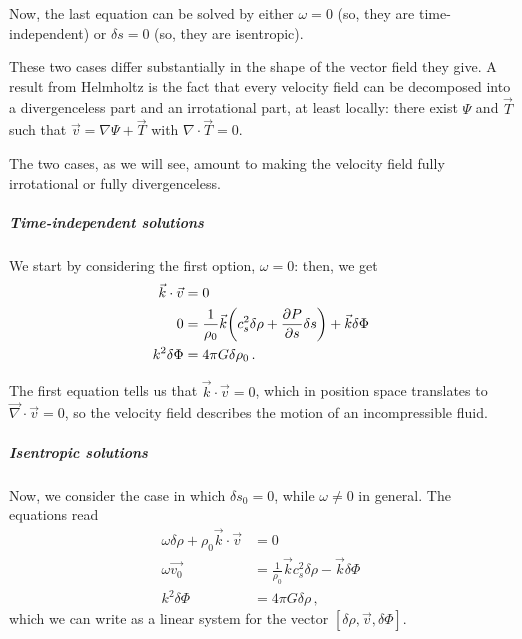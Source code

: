 \documentclass[main.tex]{subfiles}
\begin{document}
Now, the last equation can be solved by either \(\omega = 0\) (so, they are time-independent) or \(\delta s = 0\) (so, they are isentropic).

These two cases differ substantially in the shape of the vector field they give. 
A result from Helmholtz is the fact that every velocity field can be decomposed into a divergenceless part and an irrotational part, at least locally: there exist \(\Psi\) and \(\vec{T}\) such that \(\vec{v} = \nabla \Psi + \vec{T}\) with \(\nabla \cdot \vec{T} = 0\). 

The two cases, as we will see, amount to making the velocity field fully irrotational or fully divergenceless.

\subparagraph{Time-independent solutions}
We start by considering the first option, \(\omega = 0\): then, we get
%
\begin{subequations}
\begin{align}
  \vec{k} \cdot \vec{v} &=0  \\
  0 &= \frac{1}{\rho_0 }  \vec{k}
  \qty(c^2_s \delta \rho + \pdv{P}{s} \delta s ) 
  + \vec{k} \delta \Phi \\
  k^2 \delta \Phi &= 4 \pi G \delta \rho_0  
\,.
\end{align}
\end{subequations}

The first equation tells us that \(\vec{k} \cdot \vec{v} = 0\), which in position space translates to \(\vec{\nabla} \cdot \vec{v} = 0\), so the velocity field describes the motion of an incompressible fluid.




\subparagraph{Isentropic solutions}
Now, we consider the case in which \(\delta s_0 =0\), while \(\omega \neq 0\) in general. The equations read
%
\begin{subequations}
\begin{align}
  \omega \delta \rho + \rho_0 \vec{k} \cdot \vec{v} &=0  \\
  \omega \vec{v_0} &= \frac{1}{\rho_0 } \vec{k}
  c^2_s \delta \rho
  - \vec{k} \delta \Phi \\
  k^2 \delta \Phi &= 4 \pi G \delta \rho 
\,,
\end{align}
\end{subequations}
%
which we can write as a linear system for the vector \([\delta \rho, \vec{v}, \delta \Phi ]\). 
\end{document}
